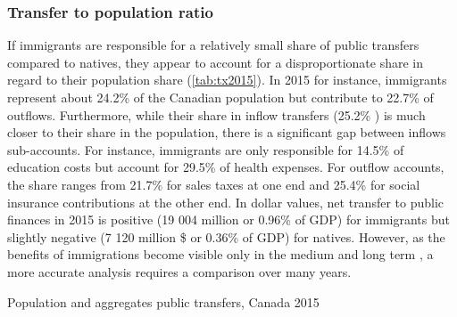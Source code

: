 \subsubsection*{Transfer to population ratio}
If immigrants are responsible for a relatively small share of public transfers compared to natives, they appear to account for a disproportionate share in regard to their population share (\autoref{tab:tx2015}).
In 2015 for instance, immigrants represent about 24.2\% of the Canadian population but contribute to 22.7\% of outflows.
Furthermore, while their share in inflow transfers (25.2\% ) is much closer to their share in the population, there is a significant gap between inflows sub-accounts.
For instance, immigrants are only responsible for 14.5\% of education costs but account for 29.5\% of health expenses.
For outflow accounts, the share ranges from 21.7\% for sales taxes at one end and 25.4\% for social insurance contributions at the other end.
In dollar values, net transfer to public finances in 2015 is positive (19 004 million or 0.96\% of GDP) for immigrants but slightly negative (7 120 million \$ or 0.36\% of GDP) for natives.
However, as the benefits of immigrations become visible only in the medium and long term \citep{Goldin:2011tg}, a more accurate analysis requires a comparison over many years.

  \begin{table}[H]%
    \caption{Population and aggregates public transfers, Canada 2015}
    \label{tab:tx2015}%
    \begin{center}
   \end{center}
\end{table}%

